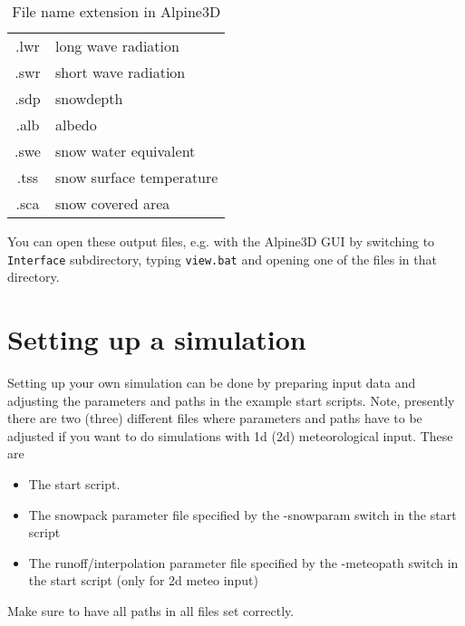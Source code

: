 \documentclass[12pt]{report}
\begin{document}
\begin{table}[b]
  \label{tab1}
  \begin{center}
    \begin{tabular}{cl}
      .lwr & long wave radiation\\
      .swr & short wave radiation\\
      .sdp & snowdepth\\
      .alb & albedo\\
      .swe & snow water equivalent\\
      .tss & snow surface temperature\\
      .sca & snow covered area\\
    \end{tabular}
    \caption{File name extension in  Alpine3D}
  \end{center}
\end{table}
You can open these output files, e.g. with the Alpine3D GUI by switching to
\verb+Interface+ subdirectory, typing \verb+view.bat+ and opening one of the files in that directory.



\section{Setting up a simulation}
Setting up your own simulation can be done by preparing input data and
adjusting the parameters and paths in the example start scripts.
Note, presently there are two (three) different files where parameters and paths have to
be adjusted if you want to do simulations with 1d (2d) meteorological input. These are
\begin{itemize}
\item The start script.
\item The snowpack parameter file specified by the -snowparam switch in the
  start script
\item The runoff/interpolation parameter file specified by the -meteopath switch in the
  start script (only for 2d meteo input)
\end{itemize}
Make sure to have all paths in all files set correctly.


\end{document}

